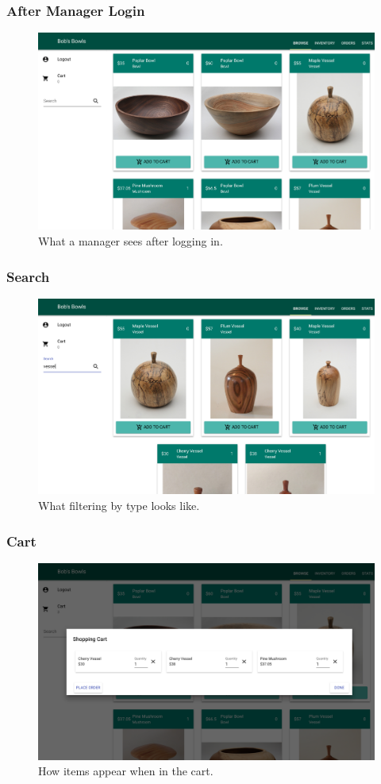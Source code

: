 \documentclass[letterpaper]{article}
\begin{document}
\subsubsection{After Manager Login}
\begin{figure}[H]
\centering
\includegraphics[width=.8\textwidth]{manager-login}
\caption{What a manager sees after logging in.}
\label{cap-manager-login}
\end{figure}


\subsubsection{Search}
\begin{figure}[H]
\centering
\includegraphics[width=.8\textwidth]{search}
\caption{What filtering by type looks like.}
\label{cap-search}
\end{figure}


\subsubsection{Cart}
\begin{figure}[H]
\centering
\includegraphics[width=.8\textwidth]{cart}
\caption{How items appear when in the cart.}
\label{cap-cart}
\end{figure}
\end{document}

